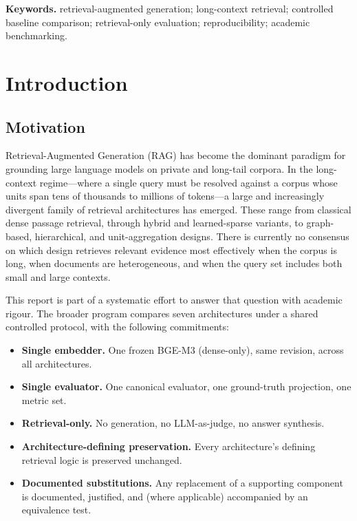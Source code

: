 \documentclass[11pt,a4paper]{article}
\begin{document}
\vfill
\noindent\textbf{Keywords.} retrieval-augmented generation;
long-context retrieval; controlled baseline comparison;
retrieval-only evaluation; reproducibility; academic benchmarking.

\newpage
\tableofcontents
\newpage

\section{Introduction}\label{sec:intro}

\subsection{Motivation}
Retrieval-Augmented Generation (RAG) has become the dominant
paradigm for grounding large language models on private and
long-tail corpora. In the long-context regime---where a single query
must be resolved against a corpus whose units span tens of
thousands to millions of tokens---a large and increasingly divergent
family of retrieval architectures has emerged. These range from
classical dense passage retrieval, through hybrid and learned-sparse
variants, to graph-based, hierarchical, and unit-aggregation
designs. There is currently no consensus on which design retrieves
relevant evidence most effectively when the corpus is long, when
documents are heterogeneous, and when the query set includes both
small and large contexts.

This report is part of a systematic effort to answer that question
with academic rigour. The broader program compares seven
architectures under a shared controlled protocol, with the following
commitments:

\begin{itemize}[leftmargin=1.5em,itemsep=0.15em]
  \item \textbf{Single embedder.} One frozen BGE-M3 (dense-only),
    same revision, across all architectures.
  \item \textbf{Single evaluator.} One canonical evaluator, one
    ground-truth projection, one metric set.
  \item \textbf{Retrieval-only.} No generation, no LLM-as-judge,
    no answer synthesis.
  \item \textbf{Architecture-defining preservation.} Every
    architecture's defining retrieval logic is preserved
    unchanged.
  \item \textbf{Documented substitutions.} Any replacement of a
    supporting component is documented, justified, and (where
    applicable) accompanied by an equivalence test.
\end{itemize}
\end{document}
